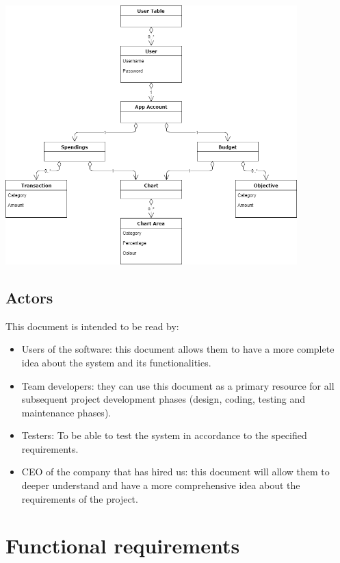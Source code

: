 \documentclass[letterpaper]{article}
\begin{document}
		\begin{center}
			\includegraphics[height=10cm]{DomainModel}
		\end{center}
		
	\subsection{Actors}
	
		This document is intended to be read by:
		
		\begin{itemize}
			
			\item Users of the software: this document allows them to have a more complete idea about the system and its functionalities.
			
			\item Team developers: they can use this document as a primary resource for all subsequent project development phases (design, coding, testing and maintenance phases).
			
			\item Testers: To be able to test the system in accordance to the specified requirements.
			
			\item CEO of the company that has hired us: this document will allow them to deeper understand and have a more comprehensive idea about the requirements of the project.
			
		\end{itemize}

\section{Functional requirements}
\end{document}

